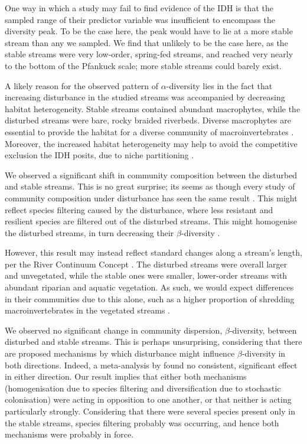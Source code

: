 \documentclass[a4paper,10pt]{article}
\begin{document}
One way in which a study may fail to find evidence of the IDH is that the sampled range of their predictor variable was insufficient to encompass the diversity peak.
To be the case here, the peak would have to lie at a more stable stream than any we sampled.
We find that unlikely to be the case here, as the stable streams were very low-order, spring-fed streams, and reached very nearly to the bottom of the Pfankuck scale; more stable streams could barely exist.

A likely reason for the observed pattern of $\alpha$-diversity lies in the fact that increasing disturbance in the studied streams was accompanied by decreasing habitat heterogeneity.
Stable streams contained abundant macrophytes, while the disturbed streams were bare, rocky braided riverbeds.
Diverse macrophytes are essential to provide the habitat for a diverse community of macroinvertebrates \parencite{macrophyte-associations}.
Moreover, the increased habitat heterogeneity may help to avoid the competitive exclusion the IDH posits, due to niche partitioning \parencite{heterogeneity-competition,idh-patch-dynamics}. %

We observed a significant shift in community composition between the disturbed and stable streams.
This is no great surprise; its seems as though every study of community composition under disturbance has seen the same result \parencite{disturbance-composition-invasion, disturbance-composition-simulate, disturbance-composition-desert, meta-richness-disturbance}.
This might reflect species filtering caused by the disturbance, where less resistant and resilient species are filtered out of the disturbed streams.
This might homogenise the disturbed streams, in turn decreasing their $\beta$-diversity \parencite{disturbance-beta-meta}.

However, this result may instead reflect standard changes along a stream's length, per the River Continuum Concept \parencite{rcc}.
The disturbed streams were overall larger and unvegetated, while the stable ones were smaller, lower-order streams with abundant riparian and aquatic vegetation.
As such, we would expect differences in their communities due to this alone, such as a higher proportion of shredding macroinvertebrates in the vegetated streams \parencite{rcc}.

We observed no significant change in community dispersion, $\beta$-diversity, between disturbed and stable streams.
This is perhaps unsurprising, considering that there are proposed mechanisms by which disturbance might influence $\beta$-diversity in both directions.
Indeed, a meta-analysis by \textcite{disturbance-beta-meta} found no consistent, significant effect in either direction.
Our result implies that either both mechanisms (homogenisation due to species filtering and diversification due to stochastic colonisation) were acting in opposition to one another, or that neither is acting particularly strongly.
Considering that there were several species present only in the stable streams, species filtering probably was occurring, and hence both mechanisms were probably in force.
\end{document}
